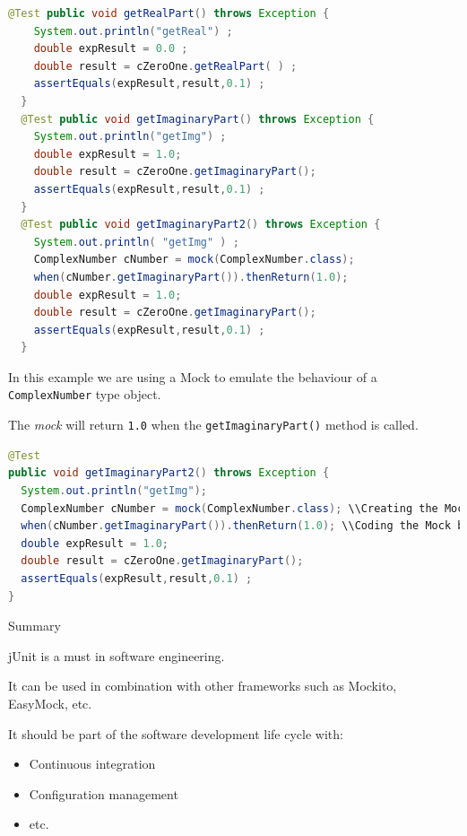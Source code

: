 \documentclass[11pt, xcolor=svgnames]{beamer}
\begin{document}
\begin{frame}[fragile]

\begin{lstlisting}[language=JAVA,basicstyle=\scriptsize]
  @Test public void getRealPart() throws Exception {
    System.out.println("getReal") ;
    double expResult = 0.0 ;
    double result = cZeroOne.getRealPart( ) ;
    assertEquals(expResult,result,0.1) ;
  }
  @Test public void getImaginaryPart() throws Exception {
    System.out.println("getImg") ;
    double expResult = 1.0;
    double result = cZeroOne.getImaginaryPart();
    assertEquals(expResult,result,0.1) ;
  }
  @Test public void getImaginaryPart2() throws Exception {
    System.out.println( "getImg" ) ;
    ComplexNumber cNumber = mock(ComplexNumber.class);
    when(cNumber.getImaginaryPart()).thenReturn(1.0);
    double expResult = 1.0;
    double result = cZeroOne.getImaginaryPart();
    assertEquals(expResult,result,0.1) ;
  }
\end{lstlisting}

\end{frame}



\begin{frame}[fragile]

In this example we are using a Mock to emulate the behaviour of a \texttt{ComplexNumber} type object.

The \emph{mock} will return  \texttt{1.0} when the \texttt{getImaginaryPart()} method is called.

\begin{lstlisting}[language=JAVA,basicstyle=\scriptsize]
@Test
public void getImaginaryPart2() throws Exception {
  System.out.println("getImg");
  ComplexNumber cNumber = mock(ComplexNumber.class); \\Creating the Mock.
  when(cNumber.getImaginaryPart()).thenReturn(1.0); \\Coding the Mock behaviour.
  double expResult = 1.0;
  double result = cZeroOne.getImaginaryPart();
  assertEquals(expResult,result,0.1) ;
}
\end{lstlisting}

\end{frame}



\begin{frame}[fragile]{Summary}

jUnit is a must in software engineering. 

It can be used in combination with other frameworks such as Mockito, EasyMock, etc.

It should be part of the software development life cycle with:
\begin{itemize}
  \item Continuous integration
  \item Configuration management
  \item etc.
\end{itemize}

\end{frame}


\end{document}
